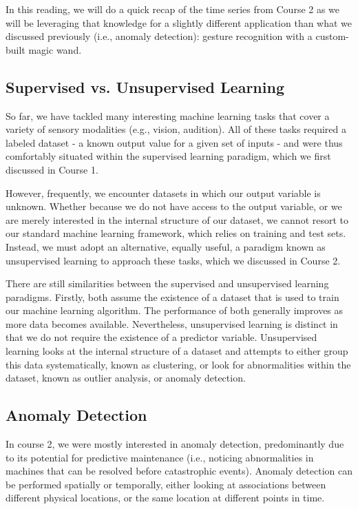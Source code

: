 In this reading, we will do a quick recap of the time series from Course 2 as we will be leveraging that knowledge for a slightly different application than what we discussed previously (i.e., anomaly detection): gesture recognition with a custom-built magic wand.

\subsection{Supervised vs. Unsupervised Learning}

So far, we have tackled many interesting machine learning tasks that cover a variety of sensory modalities (e.g., vision, audition). All of these tasks required a labeled dataset - a known output value for a given set of inputs - and were thus comfortably situated within the supervised learning paradigm, which we first discussed in Course 1.

However, frequently, we encounter datasets in which our output variable is unknown. Whether because we do not have access to the output variable, or we are merely interested in the internal structure of our dataset, we cannot resort to our standard machine learning framework, which relies on training and test sets. Instead, we must adopt an alternative, equally useful, a paradigm known as unsupervised learning to approach these tasks, which we discussed in Course 2. 

There are still similarities between the supervised and unsupervised learning paradigms. Firstly, both assume the existence of a dataset that is used to train our machine learning algorithm. The performance of both generally improves as more data becomes available. Nevertheless, unsupervised learning is distinct in that we do not require the existence of a predictor variable. Unsupervised learning looks at the internal structure of a dataset and attempts to either group this data systematically, known as clustering, or look for abnormalities within the dataset, known as outlier analysis, or anomaly detection.

\subsection{Anomaly Detection}

In course 2, we were mostly interested in anomaly detection, predominantly due to its potential for predictive maintenance (i.e., noticing abnormalities in machines that can be resolved before catastrophic events). Anomaly detection can be performed spatially or temporally, either looking at associations between different physical locations, or the same location at different points in time.

